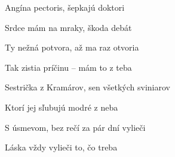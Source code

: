 \begin{song}
\bigskip

\Refren

\bigskip

 Angína pectoris,  šepkajú doktori \par
{} Srdce mám na mraky, škoda debát  \par
{} Ty nežná potvora,  až ma raz otvoria \par
{} Tak zistia príčinu -- mám to z teba  \par
{} \par

\bigskip

Sestrička z Kramárov, sen všetkých sviniarov \par
{} Ktorí jej sľubujú modré z neba \par
S úsmevom, bez rečí za pár dní vylieči \par
{} Láska vždy vylieči to, čo treba  \par

\bigskip

\Refren

\bigskip

\Refren\ 

\end{song}
